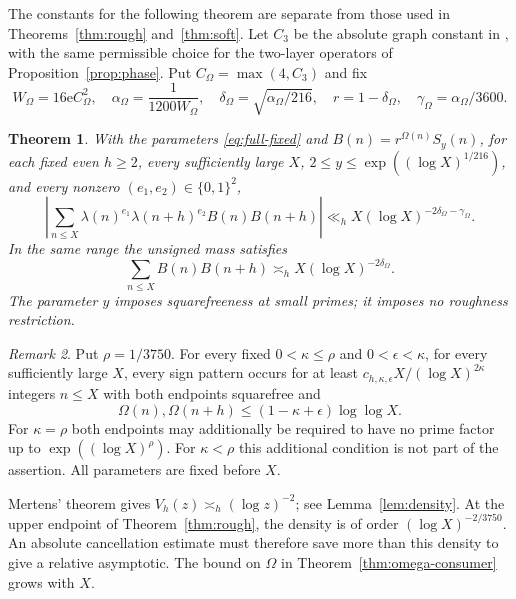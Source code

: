 \documentclass[11pt]{article}
\newtheorem{theorem}{Theorem}[section]
\theoremstyle{definition}
\newcommand{\e}{\mathrm e}
\theoremstyle{remark}
\newtheorem{remark}[theorem]{Remark}
\numberwithin{equation}{section}
\begin{document}
The constants for the following theorem are separate from those used in Theorems~\ref{thm:rough} and~\ref{thm:soft}.
Let $C_3$ be the absolute graph constant in \cite[(8.7), p.~41]{OpenAI007}, with the same permissible choice for the
two-layer operators of Proposition~\ref{prop:phase}. Put $C_\Omega=\max(4,C_3)$ and fix
\begin{equation}\label{eq:full-fixed}
 W_\Omega=16\e C_\Omega^2,\quad \alpha_\Omega=\frac1{1200W_\Omega},\quad
 \delta_\Omega=\sqrt{\alpha_\Omega/216},\quad r=1-\delta_\Omega,\quad
 \gamma_\Omega=\alpha_\Omega/3600.
\end{equation}
\begin{theorem}\label{thm:full}
With the parameters \eqref{eq:full-fixed} and $B(n)=r^{\Omega(n)}S_y(n)$, for each fixed even $h\ge2$, every
sufficiently large $X$, $2\le y\le\exp((\log X)^{1/216})$, and every nonzero
$(e_1,e_2)\in\{0,1\}^2$,
\begin{equation}\label{eq:full-main}
 \left|\sum_{n\le X}\lambda(n)^{e_1}\lambda(n+h)^{e_2}B(n)B(n+h)\right|
 \ll_h X(\log X)^{-2\delta_\Omega-\gamma_\Omega}.
\end{equation}
In the same range the unsigned mass satisfies
\begin{equation}\label{eq:full-mass-main}
 \sum_{n\le X}B(n)B(n+h)\asymp_h X(\log X)^{-2\delta_\Omega}.
\end{equation}
The parameter $y$ imposes squarefreeness at small primes; it imposes no roughness restriction.
\end{theorem}

\begin{remark}\label{rem:tradeoff}
Put $\rho=1/3750$. For every fixed $0<\kappa\le\rho$ and $0<\epsilon<\kappa$, for every sufficiently large $X$, every sign pattern occurs for at least
$c_{h,\kappa,\epsilon}X/(\log X)^{2\kappa}$ integers $n\le X$ with both endpoints squarefree and
\begin{equation}\label{eq:tradeoff}
 \Omega(n),\Omega(n+h)\le(1-\kappa+\epsilon)\log\log X.
\end{equation}
For $\kappa=\rho$ both endpoints may additionally be required to have no prime factor up to
$\exp((\log X)^\rho)$. For $\kappa<\rho$ this additional condition is not part of the assertion.
All parameters are fixed before $X$.
\end{remark}

Mertens' theorem gives $V_h(z)\asymp_h(\log z)^{-2}$; see Lemma~\ref{lem:density}.
At the upper endpoint of Theorem~\ref{thm:rough}, the density is of order $(\log X)^{-2/3750}$.
An absolute cancellation estimate must therefore save more than this density to give a relative asymptotic.
The bound on $\Omega$ in Theorem~\ref{thm:omega-consumer} grows with $X$.
\end{document}
